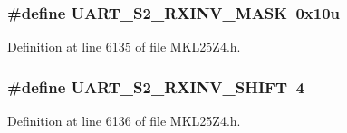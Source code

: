 \subsubsection[{\texorpdfstring{U\+A\+R\+T\+\_\+\+S2\+\_\+\+R\+X\+I\+N\+V\+\_\+\+M\+A\+SK}{UART_S2_RXINV_MASK}}]{\setlength{\rightskip}{0pt plus 5cm}\#define U\+A\+R\+T\+\_\+\+S2\+\_\+\+R\+X\+I\+N\+V\+\_\+\+M\+A\+SK~0x10u}\hypertarget{group___u_a_r_t___register___masks_ga80b6af8d528290157cd93b8e33402e9e}{}\label{group___u_a_r_t___register___masks_ga80b6af8d528290157cd93b8e33402e9e}


Definition at line 6135 of file M\+K\+L25\+Z4.\+h.

\subsubsection[{\texorpdfstring{U\+A\+R\+T\+\_\+\+S2\+\_\+\+R\+X\+I\+N\+V\+\_\+\+S\+H\+I\+FT}{UART_S2_RXINV_SHIFT}}]{\setlength{\rightskip}{0pt plus 5cm}\#define U\+A\+R\+T\+\_\+\+S2\+\_\+\+R\+X\+I\+N\+V\+\_\+\+S\+H\+I\+FT~4}\hypertarget{group___u_a_r_t___register___masks_ga9e9f9f846534bbefdb7c7b88a66d29fc}{}\label{group___u_a_r_t___register___masks_ga9e9f9f846534bbefdb7c7b88a66d29fc}


Definition at line 6136 of file M\+K\+L25\+Z4.\+h.

